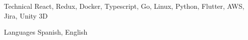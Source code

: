 
\begin{cvskills}

  \cvskill
    {Technical} %
    {React, Redux, Docker, Typescript, Go, Linux, Python, Flutter, AWS, Jira, Unity 3D} %





  \cvskill
    {Languages} %
    {Spanish, English} %

\end{cvskills}
